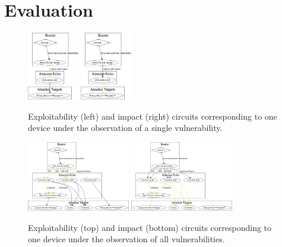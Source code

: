 \section{Evaluation}
\label{sec:evaluation}

\begin{figure}[t]
    \centering
    \includegraphics[width=0.20\textwidth]{exploitability_circuit1cve.png}
    \includegraphics[width=0.20\textwidth]{impact_circuit1cve.png}
    \caption{Exploitability (left) and impact (right) circuits corresponding to one device under the observation of a single vulnerability.}
    \label{fig:exp1cve}
\end{figure}

\begin{figure}[t]
    \centering
    \includegraphics[width=0.40\textwidth]{exploitability_circuit1dev.png}
    \includegraphics[width=0.40\textwidth]{impact_circuit1dev.png}
    \caption{Exploitability (top) and impact (bottom) circuits corresponding to one device under the observation of all vulnerabilities.}
    \label{fig:exp1dev}
\end{figure}

